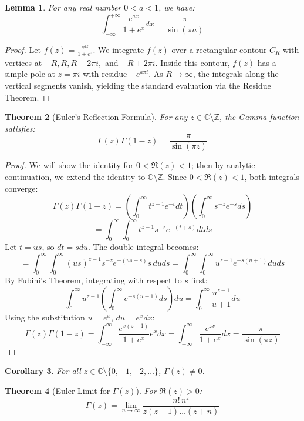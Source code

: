 \documentclass[a4paper,11pt]{article}
\newtheorem{theorem}{Theorem}
\newtheorem{lemma}[theorem]{Lemma}
\newtheorem{corollary}[theorem]{Corollary}
\begin{document}
\begin{lemma}
  For any real number $0 < a < 1$, we have:
  \[ \int_{-\infty}^{+\infty} \frac{e^{ax}}{1+e^x} dx =
  \frac{\pi}{\sin(\pi a)} \]
\end{lemma}

\begin{proof}
  Let $f(z) = \frac{e^{az}}{1+e^z}$. We integrate $f(z)$ over a
  rectangular contour $C_R$ with vertices at $-R, R, R+2\pi i,$ and
  $-R+2\pi i$. Inside this contour, $f(z)$ has a simple pole at $z =
  \pi i$ with residue $-e^{a\pi i}$. As $R \to \infty$, the integrals
  along the vertical segments vanish, yielding the standard
  evaluation via the Residue Theorem.
\end{proof}

\begin{theorem}[Euler's Reflection Formula]
  For any $z \in \mathbb{C} \setminus \mathbb{Z}$, the Gamma function satisfies:
  \[ \Gamma(z)\Gamma(1-z) = \frac{\pi}{\sin(\pi z)} \]
\end{theorem}

\begin{proof}
  We will show the identity for $0 < \Re(z) < 1$; then by analytic
  continuation, we extend the identity to $\mathbb{C} \setminus
  \mathbb{Z}$. Since $0 < \Re(z) < 1$, both integrals converge:
  \[ \Gamma(z)\Gamma(1-z) = \left( \int_{0}^{\infty} t^{z-1} e^{-t}
  dt \right) \left( \int_{0}^{\infty} s^{-z} e^{-s} ds \right) \]
  \[ = \int_{0}^{\infty} \int_{0}^{\infty} t^{z-1} s^{-z} e^{-(t+s)} dt ds \]
  Let $t = us$, so $dt = s du$. The double integral becomes:
  \[ = \int_{0}^{\infty} \int_{0}^{\infty} (us)^{z-1} s^{-z}
    e^{-(us+s)} s \, du ds = \int_{0}^{\infty} \int_{0}^{\infty}
  u^{z-1} e^{-s(u+1)} du ds \]
  By Fubini's Theorem, integrating with respect to $s$ first:
  \[ \int_{0}^{\infty} u^{z-1} \left( \int_{0}^{\infty} e^{-s(u+1)}
  ds \right) du = \int_{0}^{\infty} \frac{u^{z-1}}{u+1} du \]
  Using the substitution $u = e^x$, $du = e^x dx$:
  \[ \Gamma(z)\Gamma(1-z) = \int_{-\infty}^{\infty}
    \frac{e^{x(z-1)}}{1+e^x} e^x dx = \int_{-\infty}^{\infty}
  \frac{e^{zx}}{1+e^x} dx = \frac{\pi}{\sin(\pi z)} \]
\end{proof}

\begin{corollary}
  For all $z \in \mathbb{C} \setminus \{0, -1, -2, \dots\}$, $\Gamma(z) \neq 0$.
\end{corollary}

\begin{theorem}[Euler Limit for $\Gamma(z)$]
  For $\Re(z) > 0$:
  \[ \Gamma(z) = \lim_{n \to \infty} \frac{n! \, n^z}{z(z+1)\dots(z+n)} \]
\end{theorem}
\end{document}
